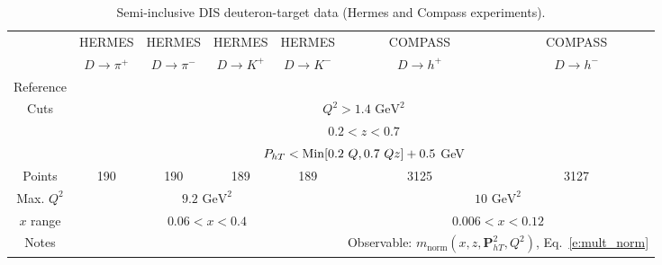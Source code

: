 \documentclass[aps,preprintnumbers,showpacs,nofootinbib,superscriptaddress,floatfix]{revtex4}
\newcommand{\Tperp}{T}
\begin{document}
\begin{table}[h!]
\begin{center}
\begin{tabular}{|c|c|c|c|c|c|c|}
 \hline
  & HERMES & HERMES & HERMES & HERMES & COMPASS & COMPASS\\
 ~          &  $D \to \pi^+$    &   $D \to \pi^-$    &  $D \to K^+$    &   $D \to K^-$      &  $D \to h^+$    &   $D \to h^-$            \\
 \hline
 Reference & \multicolumn{4}{c|}{\cite{Airapetian:2012ki}}        &\multicolumn{2}{c|}{\cite{Adolph:2013stb}} \\
\hline
\multirow{3}{*}{Cuts}             & \multicolumn{6}{c|}{$Q^2 > 1.4 \text{ GeV}^2$}     \\
             & \multicolumn{6}{c|}{$0.2 <z <0.7$}     \\
             & \multicolumn{6}{c|}{$P_{h \Tperp}< {\rm Min}[0.2\ Q, 0.7 \ Q z ] +0.5$ GeV}     \\
\hline
 Points         &  190 & 190 & 189 & 189   & 3125 & 3127   \\
 \hline
Max. $Q^2$      &  \multicolumn{4}{c|}{$9.2 \text{ GeV}^2 $}      & \multicolumn{2}{c|}{$10 \text{ GeV}^2 $}             \\
 \hline
$x$ range       & \multicolumn{4}{c|}{$0.06 < x < 0.4$ }    &  \multicolumn{2}{c|}{$0.006 < x < 0.12$ }             \\
\hline
Notes         &\multicolumn{4}{c|}{ }   & \multicolumn{2}{c|}{Observable: $\displaystyle m_{\text{norm}}(x,z,\bm{P}_{h\Tperp}^2, Q^2)$, Eq.~\eqref{e:mult_norm}}  \\
\hline 
\end{tabular}
\caption{Semi-inclusive DIS deuteron-target data (Hermes and Compass experiments).}
\label{t:data_SIDIS_deuteron}
\end{center}
\end{table}
\end{document}
